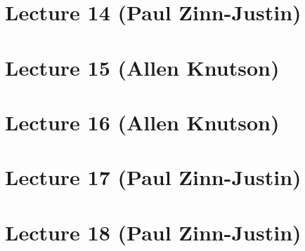 \documentclass[12pt]{amsart}
\numberwithin{equation}{section}
\theoremstyle{definition}
\numberwithin{figure}{section}
\begin{document}
\section{Lecture 14 (Paul Zinn-Justin)}

\section{Lecture 15 (Allen Knutson)}

\section{Lecture 16 (Allen Knutson)}

\section{Lecture 17 (Paul Zinn-Justin)}

\section{Lecture 18 (Paul Zinn-Justin)}
\end{document}
